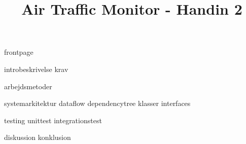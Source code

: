 \documentclass[a4paper]{article}								%
\title{Air Traffic Monitor - Handin 2}
\begin{document}

	{frontpage}

	\tableofcontents\thispagestyle{fancy} \newpage
	
	
	{introbeskrivelse}
	{krav}

	{arbejdsmetoder}

	{systemarkitektur}
	{dataflow}
	{dependencytree}
	{klasser}
	{interfaces}

	{testing}
	{unittest}
	{integrationstest}

	{diskussion}
	{konklusion}
	



\end{document}
